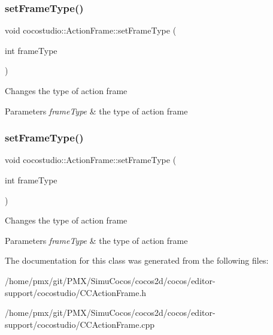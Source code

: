 \subsubsection{\texorpdfstring{set\+Frame\+Type()}{setFrameType()}\hspace{0.1cm}{\footnotesize\ttfamily [1/2]}}
{\footnotesize\ttfamily void cocostudio\+::\+Action\+Frame\+::set\+Frame\+Type (\begin{DoxyParamCaption}\item[{int}]{frame\+Type }\end{DoxyParamCaption})}

Changes the type of action frame


\begin{DoxyParams}{Parameters}
{\em frame\+Type} & the type of action frame \\
\hline
\end{DoxyParams}
\mbox{\label{classcocostudio_1_1ActionFrame_ad2086156bd154ae75dc32515fd150314}} 
\subsubsection{\texorpdfstring{set\+Frame\+Type()}{setFrameType()}\hspace{0.1cm}{\footnotesize\ttfamily [2/2]}}
{\footnotesize\ttfamily void cocostudio\+::\+Action\+Frame\+::set\+Frame\+Type (\begin{DoxyParamCaption}\item[{int}]{frame\+Type }\end{DoxyParamCaption})}

Changes the type of action frame


\begin{DoxyParams}{Parameters}
{\em frame\+Type} & the type of action frame \\
\hline
\end{DoxyParams}


The documentation for this class was generated from the following files\+:\begin{DoxyCompactItemize}
\item 
/home/pmx/git/\+P\+M\+X/\+Simu\+Cocos/cocos2d/cocos/editor-\/support/cocostudio/C\+C\+Action\+Frame.\+h\item 
/home/pmx/git/\+P\+M\+X/\+Simu\+Cocos/cocos2d/cocos/editor-\/support/cocostudio/C\+C\+Action\+Frame.\+cpp\end{DoxyCompactItemize}
